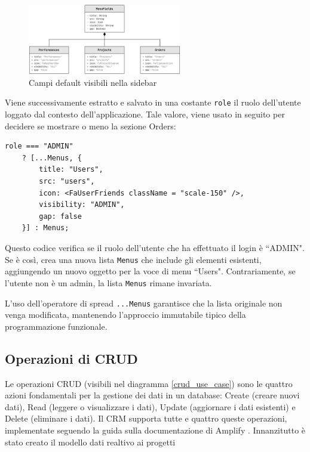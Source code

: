 \documentclass[target=bach,aauheader=,style=]{thud}
\begin{document}
\begin{figure}[H]
    \centering
    \includegraphics[width=0.6\textwidth]{img/diagrammi/uml_menufields.pdf} 
    \caption{Campi default visibili nella sidebar}
    \label{default_fields}
\end{figure}

\noindent Viene successivamente estratto e salvato in una costante \texttt{role} il ruolo dell'utente loggato dal contesto dell'applicazione. Tale valore, viene usato in seguito per decidere se mostrare o meno la sezione Orders:

\begin{lstlisting}[caption=Verifica ruolo]
role === "ADMIN" 
    ? [...Menus, {
        title: "Users",
        src: "users",
        icon: <FaUserFriends className = "scale-150" />,
        visibility: "ADMIN",
        gap: false
    }] : Menus;
\end{lstlisting}

\noindent Questo codice verifica se il ruolo dell'utente che ha effettuato il login è ``ADMIN". Se è così, crea una nuova lista \texttt{Menus} che include gli elementi esistenti, aggiungendo un nuovo oggetto per la voce di menu ``Users". Contrariamente, se l'utente non è un admin, la lista \texttt{Menus} rimane invariata. 

\noindent L'uso dell'operatore di spread \texttt{...Menus} garantisce che la lista originale non venga modificata, mantenendo l'approccio immutabile tipico della programmazione funzionale.

\subsection{Operazioni di CRUD}
Le operazioni CRUD (visibili nel diagramma \ref{crud_use_case}) sono le quattro azioni fondamentali per la gestione dei dati in un database: Create (creare nuovi dati), Read (leggere o visualizzare i dati), Update (aggiornare i dati esistenti) e Delete (eliminare i dati). Il CRM supporta tutte e quattro queste operazioni, implementate seguendo la guida sulla documentazione di Amplify \cite{awsamplifynextjs2024}. Innanzitutto è stato creato il modello dati realtivo ai progetti
\end{document}
